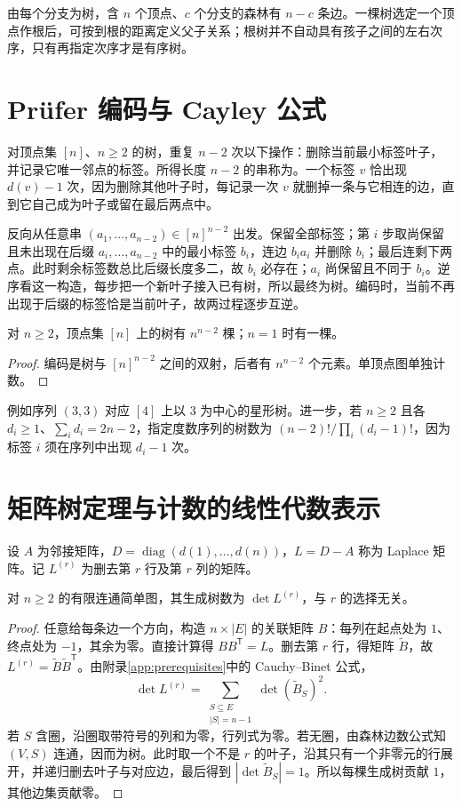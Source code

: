 \documentclass[UTF8,12pt,a4paper,fontset=fandol]{ctexbook}
\begin{document}
由每个分支为树，含 $n$ 个顶点、$c$ 个分支的森林有 $n-c$ 条边。一棵树选定一个顶点作根后，可按到根的距离定义父子关系；根树并不自动具有孩子之间的左右次序，只有再指定次序才是有序树。

\section{Pr\"ufer 编码与 Cayley 公式}

对顶点集 $[n]$、$n\ge2$ 的树，重复 $n-2$ 次以下操作：删除当前最小标签叶子，并记录它唯一邻点的标签。所得长度 $n-2$ 的串称为。一个标签 $v$ 恰出现 $d(v)-1$ 次，因为删除其他叶子时，每记录一次 $v$ 就删掉一条与它相连的边，直到它自己成为叶子或留在最后两点中。

反向从任意串 $(a_1,\ldots,a_{n-2})\in[n]^{n-2}$ 出发。保留全部标签；第 $i$ 步取尚保留且未出现在后缀 $a_i,\ldots,a_{n-2}$ 中的最小标签 $b_i$，连边 $b_ia_i$ 并删除 $b_i$；最后连剩下两点。此时剩余标签数总比后缀长度多二，故 $b_i$ 必存在；$a_i$ 尚保留且不同于 $b_i$。逆序看这一构造，每步把一个新叶子接入已有树，所以最终为树。编码时，当前不再出现于后缀的标签恰是当前叶子，故两过程逐步互逆。

\begin{theorem}[Cayley 公式]
对 $n\ge2$，顶点集 $[n]$ 上的树有 $n^{n-2}$ 棵；$n=1$ 时有一棵。
\end{theorem}
\begin{proof}
编码是树与 $[n]^{n-2}$ 之间的双射，后者有 $n^{n-2}$ 个元素。单顶点图单独计数。
\end{proof}

例如序列 $(3,3)$ 对应 $[4]$ 上以 $3$ 为中心的星形树。进一步，若 $n\ge2$ 且各 $d_i\ge1$、$\sum_i d_i=2n-2$，指定度数序列的树数为 $(n-2)!/\prod_i(d_i-1)!$，因为标签 $i$ 须在序列中出现 $d_i-1$ 次。

\section{矩阵树定理与计数的线性代数表示}

设 $A$ 为邻接矩阵，$D=\operatorname{diag}(d(1),\ldots,d(n))$，$L=D-A$ 称为 Laplace 矩阵。记 $L^{(r)}$ 为删去第 $r$ 行及第 $r$ 列的矩阵。

\begin{theorem}
对 $n\ge2$ 的有限连通简单图，其生成树数为 $\det L^{(r)}$，与 $r$ 的选择无关。
\end{theorem}
\begin{proof}
任意给每条边一个方向，构造 $n\times |E|$ 的关联矩阵 $B$：每列在起点处为 $1$、终点处为 $-1$，其余为零。直接计算得 $BB^{\mathsf T}=L$。删去第 $r$ 行，得矩阵 $\widetilde B$，故 $L^{(r)}=\widetilde B\widetilde B^{\mathsf T}$。由附录\ref{app:prerequisites}中的 Cauchy--Binet 公式，
\[
 \det L^{(r)}=\sum_{\substack{S\subseteq E\\|S|=n-1}}
                 \det(\widetilde B_S)^2.
\]
若 $S$ 含圈，沿圈取带符号的列和为零，行列式为零。若无圈，由森林边数公式知 $(V,S)$ 连通，因而为树。此时取一个不是 $r$ 的叶子，沿其只有一个非零元的行展开，并递归删去叶子与对应边，最后得到 $|\det\widetilde B_S|=1$。所以每棵生成树贡献 $1$，其他边集贡献零。
\end{proof}
\end{document}
